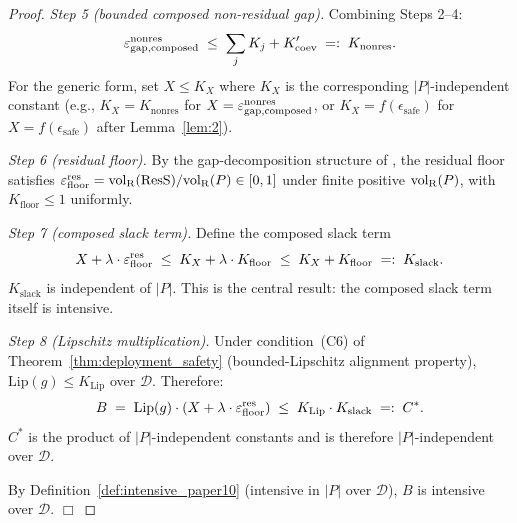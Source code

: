 \begin{proof}
\emph{Step 5 (bounded composed non-residual gap).}  Combining
Steps 2--4:
\[
  \varepsilon_{\mathrm{gap},\mathrm{composed}}^{\mathrm{nonres}} \;\leq\; \sum_j K_j + K'_{\mathrm{coev}}
  \;=:\; K_{\mathrm{nonres}}.
\]
For the generic form, set $X \leq K_X$ where $K_X$ is the corresponding
$|P|$-independent constant (e.g., $K_X = K_{\mathrm{nonres}}$ for
$X = \varepsilon_{\mathrm{gap},\mathrm{composed}}^{\mathrm{nonres}}$, or $K_X = f(\epsilon_{\mathrm{safe}})$ for
$X = f(\epsilon_{\mathrm{safe}})$ after Lemma~\ref{lem:2}).

\emph{Step 6 (residual floor).}  By the gap-decomposition structure
of \citep[Microfoundation]{lasser2026micro}, the residual floor
satisfies
$\varepsilon_{\mathrm{floor}}^{\mathrm{res}} = {\operatorname{vol}_{\mathrm{R}}}(\mathrm{ResS})/{\operatorname{vol}_{\mathrm{R}}}(P) \in [0, 1]$
under finite positive ${\operatorname{vol}_{\mathrm{R}}}(P)$, with
$K_{\mathrm{floor}} \leq 1$ uniformly.

\emph{Step 7 (composed slack term).}  Define the composed slack term
\[
  X + \lambda \cdot \varepsilon_{\mathrm{floor}}^{\mathrm{res}} \;\leq\; K_X + \lambda \cdot K_{\mathrm{floor}}
  \;\leq\; K_X + K_{\mathrm{floor}} \;=:\; K_{\mathrm{slack}}.
\]
$K_{\mathrm{slack}}$ is independent of $|P|$.  This is the central
result: the composed slack term itself is intensive.

\emph{Step 8 (Lipschitz multiplication).}  Under condition~(C6) of
Theorem~\ref{thm:deployment_safety} (bounded-Lipschitz alignment
property), $\mathrm{Lip}(g) \leq K_{\mathrm{Lip}}$ over $\mathcal{D}$.
Therefore:
\[
  B \;=\; \mathrm{Lip}(g) \cdot (X + \lambda \cdot \varepsilon_{\mathrm{floor}}^{\mathrm{res}})
  \;\leq\; K_{\mathrm{Lip}} \cdot K_{\mathrm{slack}} \;=:\; C^*.
\]
$C^*$ is the product of $|P|$-independent constants and is therefore
$|P|$-independent over $\mathcal{D}$.

By Definition~\ref{def:intensive_paper10} (intensive in $|P|$ over
$\mathcal{D}$), $B$ is intensive over $\mathcal{D}$. $\Box$
\end{proof}

